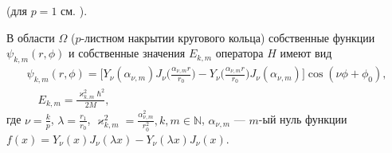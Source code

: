 \begin{theorem}{\normalfont (для $p=1$ см. \cite[с.~165.]{wref10})}.

В  области $\Omega$ ($p$-листном накрытии кругового кольца)  собственные функции $\psi_{k,m}(r,\phi)$ и собственные значения $E_{k,m}$ оператора $\hat{H}$ имеют вид
\begin{multline*}
\psi_{k,m}(r,\phi) = \biggl[ Y_\nu(\alpha_{\nu, m}) J_\nu\biggl(\frac{\alpha_{\nu, m}r}{r_0}\biggr) - Y_\nu\biggl(\frac{\alpha_{\nu, m}r}{r_0}\biggr) J_\nu(\alpha_{\nu, m}) \biggr] \cos{(\nu \phi+\phi_0)}, \\
\quad E_{k,m}= \frac{\varkappa^2_{k,m}\hbar^2}{2M},
\end{multline*}
где 
$\nu=\frac{k}{p}$,  $\lambda = \frac{r_1}{r_0}$,
$\varkappa^2_{k,m}=\frac{\alpha_{\nu, m}^2}{r_0^2},  k, m \in \mathbb{N}$, $\alpha_{\nu, m}$ --- $m$-ый нуль функции $f(x) = Y_\nu(x) J_\nu(\lambda x) - Y_\nu(\lambda x) J_\nu(x)$.
\label{th:sect1_theorem1}
\end{theorem}
